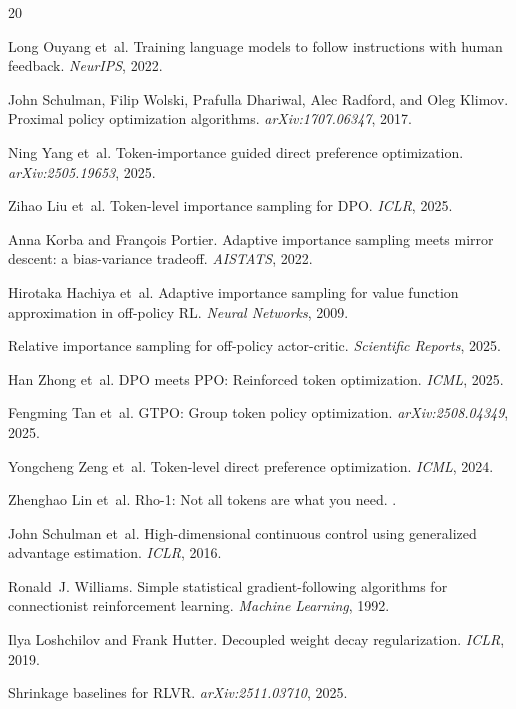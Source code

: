 \documentclass[11pt,a4paper]{article}
\begin{document}
\begin{thebibliography}{20}

Long Ouyang et~al.
\newblock Training language models to follow instructions with human feedback.
\newblock \emph{NeurIPS}, 2022.

John Schulman, Filip Wolski, Prafulla Dhariwal, Alec Radford, and Oleg Klimov.
\newblock Proximal policy optimization algorithms.
\newblock \emph{arXiv:1707.06347}, 2017.

Ning Yang et~al.
\newblock Token-importance guided direct preference optimization.
\newblock \emph{arXiv:2505.19653}, 2025.

Zihao Liu et~al.
\newblock Token-level importance sampling for DPO.
\newblock \emph{ICLR}, 2025.

Anna Korba and Fran\c{c}ois Portier.
\newblock Adaptive importance sampling meets mirror descent: a bias-variance tradeoff.
\newblock \emph{AISTATS}, 2022.

Hirotaka Hachiya et~al.
\newblock Adaptive importance sampling for value function approximation in off-policy RL.
\newblock \emph{Neural Networks}, 2009.

Relative importance sampling for off-policy actor-critic.
\newblock \emph{Scientific Reports}, 2025.

Han Zhong et~al.
\newblock DPO meets PPO: Reinforced token optimization.
\newblock \emph{ICML}, 2025.

Fengming Tan et~al.
\newblock GTPO: Group token policy optimization.
\newblock \emph{arXiv:2508.04349}, 2025.

Yongcheng Zeng et~al.
\newblock Token-level direct preference optimization.
\newblock \emph{ICML}, 2024.

Zhenghao Lin et~al.
\newblock Rho-1: Not all tokens are what you need.
.

John Schulman et~al.
\newblock High-dimensional continuous control using generalized advantage estimation.
\newblock \emph{ICLR}, 2016.

Ronald~J. Williams.
\newblock Simple statistical gradient-following algorithms for connectionist reinforcement learning.
\newblock \emph{Machine Learning}, 1992.

Ilya Loshchilov and Frank Hutter.
\newblock Decoupled weight decay regularization.
\newblock \emph{ICLR}, 2019.

Shrinkage baselines for RLVR.
\newblock \emph{arXiv:2511.03710}, 2025.

\end{thebibliography}
\end{document}

